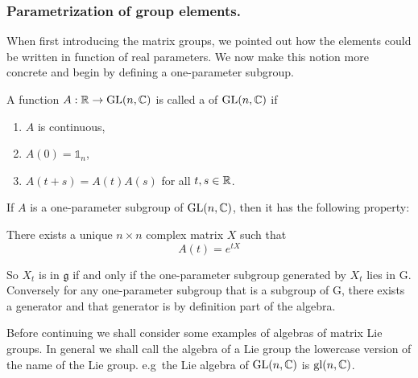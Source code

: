 \subsubsection{Parametrization of group elements.}
When first introducing the matrix groups, we pointed out how the elements could be written in function of real parameters. We now make this notion more concrete and begin by defining a one-parameter subgroup.
\begin{definition}
A function $A : \mathbb{R} \to \operatorname{GL}(n, \mathbb{C})$ is called a  of $\operatorname{GL}(n, \mathbb{C})$ if
\begin{enumerate}
\item $A$ is continuous,
\item $A(0) = \mathbb{1}_n$,
\item $A(t+s) = A(t)A(s)$ for all $t,s \in \mathbb{R}$.
\end{enumerate}
\end{definition}
If $A$ is a one-parameter subgroup of $\operatorname{GL}(n,\mathbb{C})$, then it has the following property:
\begin{eigenschap}
There exists a unique $n\times n$ complex matrix $X$ such that
\[ A(t) = e^{tX} \]
\end{eigenschap}

So $X_t$ is in $\mathfrak{g}$ if and only if the one-parameter subgroup generated by $X_t$ lies in G. Conversely for any one-parameter subgroup that is a subgroup of G, there exists a generator and that generator is by definition part of the algebra.

Before continuing we shall consider some examples of algebras of matrix Lie groups. In general we shall call the algebra of a Lie group the lowercase version of the name of the Lie group. e.g\, the Lie algebra of $\operatorname{GL}(n, \mathbb{C})$ is $\operatorname{gl}(n,\mathbb{C})$.

